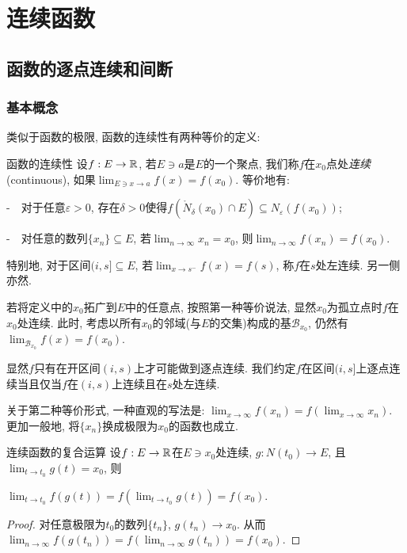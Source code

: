 \chapter{连续函数}

\section{函数的逐点连续和间断}

\subsection{基本概念}

类似于函数的极限, 函数的连续性有两种等价的定义: 

\begin{definition}{函数的连续性}
	设$f:E \to \mathbb{R}$, 若$E \ni a$是$E$的一个聚点, 我们称$f$在$x_0$点处\textit{连续}(continuous), 如果$\lim_{E \ni x \to a} f(x) = f(x_0)$. 等价地有: 
	
	-~~对于任意$\varepsilon >0$, 存在$\delta >0$使得$f(\mathring{N}_{\delta} (x_0) \cap E) \subseteq N_{\varepsilon} (f(x_0))$; 
	
	-~~对任意的数列$\{ x_n \} \subseteq E$, 若$\lim_{n \to \infty} x_n = x_0$, 则$\lim_{n \to \infty} f(x_n) = f(x_0)$. 
	
	\noindent
	特别地, 对于区间$(i,s] \subseteq E$, 若$\lim_{x \to s^-} f(x) = f(s)$, 称$f$在$s$处左连续. 另一侧亦然. 
\end{definition}
\begin{remark}
	若将定义中的$x_0$拓广到$E$中的任意点, 按照第一种等价说法, 显然$x_0$为孤立点时$f$在$x_0$处连续. 此时, 考虑以所有$x_0$的邻域(与$E$的交集)构成的基$\mathcal{B}_{x_0}$, 仍然有$\lim_{\mathcal{B}_{x_0}} f(x) = f(x_0)$. 
\end{remark}
\begin{remark}
	显然$f$只有在开区间$(i,s)$上才可能做到逐点连续. 我们约定$f$在区间$(i,s]$上逐点连续当且仅当$f$在$(i,s)$上连续且在$s$处左连续. 
\end{remark}

关于第二种等价形式, 一种直观的写法是: $\lim_{x \to \infty} f(x_n) = f(\lim_{x \to \infty}x_n)$. 更加一般地, 将$\{ x_n \}$换成极限为$x_0$的函数也成立. 

\begin{proposition}{连续函数的复合运算}
	设$f:E\to \mathbb{R}$在$E \ni x_0$处连续, $g:N(t_0) \to E$, 且$\lim_{t \to t_0} g(t)=x_0$, 则
	\begin{center}
		$\displaystyle \lim_{t \to t_0} f(g(t)) = f\left(\lim_{t \to t_0} g(t) \right) = f(x_0). $
	\end{center}
\end{proposition}
\begin{proof}
	对任意极限为$t_0$的数列$\{ t_n \}$, $g(t_n) \to x_0$. 从而$\lim_{n\to \infty} f(g(t_n)) = f(\lim_{n\to \infty}g(t_n)) = f(x_0)$. 
\end{proof}


